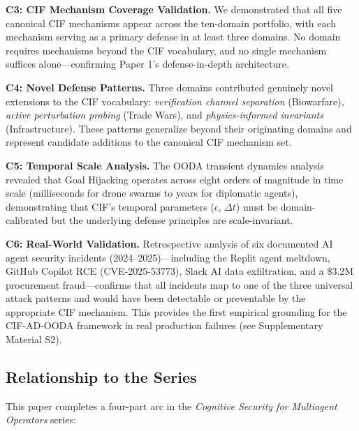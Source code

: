 \documentclass[
]{article}
\begin{document}
\textbf{C3: CIF Mechanism Coverage Validation.} We demonstrated that all
five canonical CIF mechanisms appear across the ten-domain portfolio,
with each mechanism serving as a primary defense in at least three
domains. No domain requires mechanisms beyond the CIF vocabulary, and no
single mechanism suffices alone---confirming Paper 1's defense-in-depth
architecture.

\textbf{C4: Novel Defense Patterns.} Three domains contributed genuinely
novel extensions to the CIF vocabulary: \emph{verification channel
separation} (Biowarfare), \emph{active perturbation probing} (Trade
Wars), and \emph{physics-informed invariants} (Infrastructure). These
patterns generalize beyond their originating domains and represent
candidate additions to the canonical CIF mechanism set.

\textbf{C5: Temporal Scale Analysis.} The OODA transient dynamics
analysis revealed that Goal Hijacking operates across eight orders of
magnitude in time scale (milliseconds for drone swarms to years for
diplomatic agents), demonstrating that CIF's temporal parameters
(\(\epsilon\), \(\Delta t\)) must be domain-calibrated but the
underlying defense principles are scale-invariant.

\textbf{C6: Real-World Validation.} Retrospective analysis of six
documented AI agent security incidents (2024--2025)---including the
Replit agent meltdown, GitHub Copilot RCE (CVE-2025-53773), Slack AI
data exfiltration, and a \$3.2M procurement fraud---confirms that all
incidents map to one of the three universal attack patterns and would
have been detectable or preventable by the appropriate CIF mechanism.
This provides the first empirical grounding for the CIF-AD-OODA
framework in real production failures (see Supplementary Material S2).

\subsection{Relationship to the
Series}\label{relationship-to-the-series}

This paper completes a four-part arc in the \emph{Cognitive Security for
Multiagent Operators} series:
\end{document}
